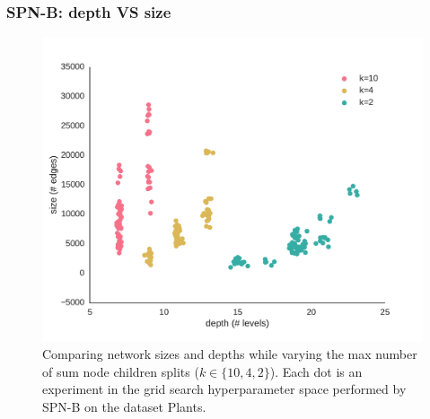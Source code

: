 \documentclass[xcolor={usenames,dvipsnames,svgnames}, compress]{beamer}
\begin{document}
\begin{frame}
  \frametitle{SPN-B: depth VS size}

  \begin{figure}[htbp]
    \begin{center}
      \includegraphics[width=0.6\linewidth]{figures/plants-depth.pdf}
      \caption{Comparing network sizes and depths while varying the max
        number of sum node children splits ($k\in\{10, 4, 2\}$). Each dot is an experiment
        in the grid search hyperparameter space performed by
        \textsf{SPN-B} on the dataset Plants.}
    \end{center}
  \end{figure}

\end{frame}
\end{document}
